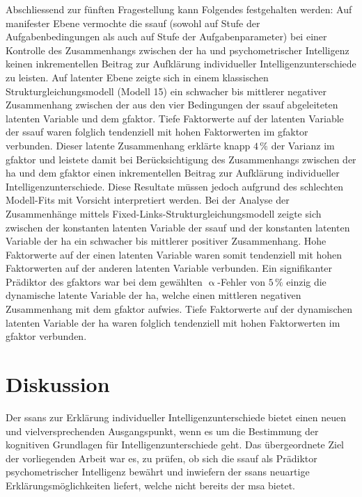 \documentclass[11pt, twoside, a4paper]{book}		%
\begin{document}
Abschliessend zur fünften Fragestellung kann Folgendes festgehalten werden: 
Auf manifester Ebene vermochte die \gls{ssauf} (sowohl auf Stufe der Aufgabenbedingungen als auch auf Stufe der Aufgabenparameter) bei einer Kontrolle des Zusammenhangs zwischen der \gls{ha} und psychometrischer Intelligenz keinen inkrementellen Beitrag zur Aufklärung individueller Intelligenzunterschiede zu leisten.
Auf latenter Ebene zeigte sich in einem klassischen Strukturgleichungsmodell (Modell 15) ein schwacher bis mittlerer negativer Zusammenhang zwischen der aus den vier Bedingungen der \gls{ssauf} abgeleiteten latenten Variable und dem \gls{gfaktor}. Tiefe Faktorwerte auf der latenten Variable der \gls{ssauf} waren folglich tendenziell mit hohen Faktorwerten im \gls{gfaktor} verbunden. 
Dieser latente Zusammenhang erklärte knapp $4\,\%$ der Varianz im \gls{gfaktor} und leistete damit bei Berücksichtigung des Zusammenhangs zwischen der \gls{ha} und dem \gls{gfaktor} einen inkrementellen Beitrag zur Aufklärung individueller Intelligenzunterschiede. Diese Resultate müssen jedoch aufgrund des schlechten Modell-Fits mit Vorsicht interpretiert werden.
Bei der Analyse der Zusammenhänge mittels Fixed-Links-Struk\-tur\-glei\-chungs\-mo\-dell zeigte sich zwischen der konstanten latenten Variable der \gls{ssauf} und der konstanten latenten Variable der \gls{ha} ein schwacher bis mittlerer positiver Zusammenhang. Hohe Faktorwerte auf der einen latenten Variable waren somit tendenziell mit hohen Faktorwerten auf der anderen latenten Variable verbunden. Ein signifikanter Prädiktor des \gls{gfaktor}s war bei dem gewählten $\upalpha$-Fehler von $5\,\%$ einzig die dynamische latente Variable der \gls{ha}, welche einen mittleren negativen Zusammenhang mit dem \gls{gfaktor} aufwies. Tiefe Faktorwerte auf der dynamischen latenten Variable der \gls{ha} waren folglich tendenziell mit hohen Faktorwerten im \gls{gfaktor} verbunden.

\chapter{Diskussion \label{cha:Diskussion}}

Der \gls{ssans} zur Erklärung individueller Intelligenzunterschiede \citep{Melnick2013} bietet einen neuen und vielversprechenden Ausgangspunkt, wenn es um die Bestimmung der kognitiven Grundlagen für Intelligenzunterschiede geht.
Das übergeordnete Ziel der vorliegenden Arbeit war es, zu prüfen, ob sich die \gls{ssauf} als Prädiktor psychometrischer Intelligenz bewährt und inwiefern der \gls{ssans} \citep{Melnick2013} neuartige Erklärungsmöglichkeiten liefert, welche nicht bereits der \gls{msa} \citep[z.~B.][]{Deary2000a, Jensen1982a, Jensen1982b, Jensen2006, Vernon1983} bietet. 
\end{document}
